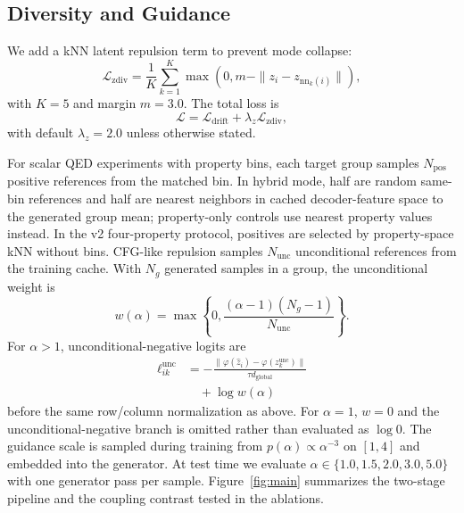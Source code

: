\documentclass[letterpaper]{article}
\begin{document}
\subsection{Diversity and Guidance}

We add a kNN latent repulsion term to prevent mode collapse:
\begin{equation}
    \mathcal{L}_{\mathrm{zdiv}} =
    \frac{1}{K}\sum_{k=1}^{K}
    \max(0,m-\|z_i-z_{\mathrm{nn}_k(i)}\|),
\end{equation}
with $K=5$ and margin $m=3.0$. The total loss is
\begin{equation}
    \mathcal{L}=\mathcal{L}_{\mathrm{drift}}+
    \lambda_z\mathcal{L}_{\mathrm{zdiv}},
\end{equation}
with default $\lambda_z=2.0$ unless otherwise stated.

For scalar QED experiments with property bins, each target group samples
$N_{\mathrm{pos}}$ positive references from the matched bin. In hybrid mode,
half are random same-bin references and half are nearest neighbors in cached
decoder-feature space to the generated group mean; property-only controls use
nearest property values instead. In the v2 four-property protocol, positives
are selected by property-space kNN without bins. CFG-like repulsion samples
$N_{\mathrm{unc}}$ unconditional references from the training cache. With
$N_g$ generated samples in a group, the unconditional weight is
\begin{equation}
    w(\alpha)=\max\left\{0,\frac{(\alpha-1)(N_g-1)}{N_{\mathrm{unc}}}\right\}.
\end{equation}
For $\alpha>1$, unconditional-negative logits are
\begin{equation}
    \begin{aligned}
    \ell^{\mathrm{unc}}_{ik}
    &= -\frac{\|\varphi(\hat z_i)-\varphi(z^{\mathrm{unc}}_k)\|}
    {\tau d_{\mathrm{global}}}\\
    &\quad+\log w(\alpha)
    \end{aligned}
\end{equation}
before the same row/column normalization as above. For $\alpha=1$, $w=0$ and
the unconditional-negative branch is omitted rather than evaluated as
$\log 0$. The guidance scale is sampled during training from
$p(\alpha)\propto\alpha^{-3}$ on $[1,4]$ and embedded into the generator. At
test time we evaluate $\alpha \in \{1.0,1.5,2.0,3.0,5.0\}$ with one generator
pass per sample.
Figure~\ref{fig:main} summarizes the two-stage pipeline and the coupling
contrast tested in the ablations.
\end{document}
